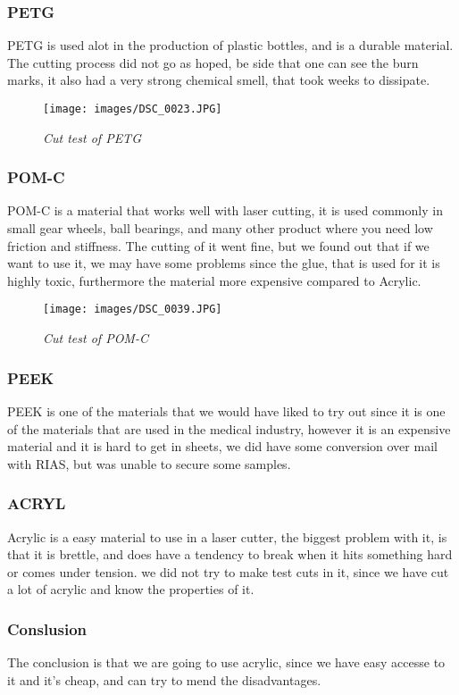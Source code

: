 \subsubsection{PETG}
PETG is used alot in the production of plastic bottles, and is a durable material.
The cutting process did not go as hoped, be side that one can see the burn marks, it also had a very strong chemical smell, that took weeks to dissipate.
\begin{figure}[!h]
	\centering
	\texttt{[image: images/DSC\_0023.JPG]}
	\caption{\small {\it {Cut test of PETG}}} \label{fig:explode}
\end{figure}
\FloatBarrier
\subsubsection{POM-C}
POM-C is a material that works well with laser cutting, it is used commonly in small gear wheels, ball bearings, and many other product where you need low friction and stiffness.
The cutting of it went fine, but we found out that if we want to use it, we may have some problems since the glue, that is used for it is highly toxic, furthermore the material more expensive compared to Acrylic.
\begin{figure}[!h]
	\centering
	\texttt{[image: images/DSC\_0039.JPG]}
	\caption{\small {\it {Cut test of POM-C}}} \label{fig:explode}
\end{figure}
\FloatBarrier

\subsubsection{PEEK}
PEEK is one of the materials that we would have liked to try out since it is one of the materials that are used in the medical industry, however it is an expensive material and it is hard to get in sheets, we did have some conversion over mail with RIAS, but was unable to secure some samples.

\subsubsection{ACRYL}
Acrylic is a easy material to use in a laser cutter, the biggest problem with it, is that it is brettle, and does have a tendency to break when it hits something hard or comes under tension.
we did not try to make test cuts in it, since we have cut a lot of acrylic and know the properties of it.


\subsubsection{Conslusion}
The conclusion is that we are going to use acrylic, since we have easy accesse to it and it's cheap, and can try to mend the disadvantages.


